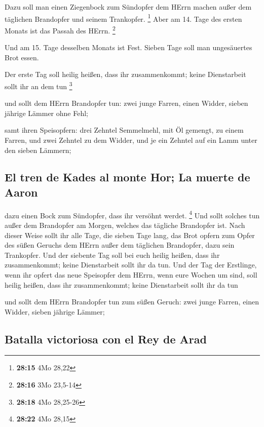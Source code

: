  Dazu soll man einen Ziegenbock zum Sündopfer dem HErrn
machen außer dem täglichen Brandopfer und seinem Trankopfer. \footnote{\textbf{28:15}
  4Mo 28,22}  Aber am 14. Tage des ersten Monats ist das
Passah des HErrn. \footnote{\textbf{28:16} 3Mo 23,5-14}

 Und am 15. Tage desselben Monats ist Fest. Sieben Tage
soll man ungesäuertes Brot essen.

 Der erste Tag soll heilig heißen, dass ihr
zusammenkommt; keine Dienstarbeit sollt ihr an dem tun \footnote{\textbf{28:18}
  4Mo 28,25-26}

 und sollt dem HErrn Brandopfer tun: zwei junge Farren,
einen Widder, sieben jährige Lämmer ohne Fehl;

 samt ihren Speisopfern: drei Zehntel Semmelmehl, mit Öl
gemengt, zu einem Farren, und zwei Zehntel zu dem Widder,
 und je ein Zehntel auf ein Lamm unter den sieben
Lämmern;

\hypertarget{el-tren-de-kades-al-monte-hor-la-muerte-de-aaron}{%
\subsection{El tren de Kades al monte Hor; La muerte de
Aaron}\label{el-tren-de-kades-al-monte-hor-la-muerte-de-aaron}}

 dazu einen Bock zum Sündopfer, dass ihr versöhnt werdet.
\footnote{\textbf{28:22} 4Mo 28,15}  Und sollt solches
tun außer dem Brandopfer am Morgen, welches das tägliche Brandopfer ist.
 Nach dieser Weise sollt ihr alle Tage, die sieben Tage
lang, das Brot opfern zum Opfer des süßen Geruchs dem HErrn außer dem
täglichen Brandopfer, dazu sein Trankopfer.  Und der
siebente Tag soll bei euch heilig heißen, dass ihr zusammenkommt; keine
Dienstarbeit sollt ihr da tun.  Und der Tag der
Erstlinge, wenn ihr opfert das neue Speisopfer dem HErrn, wenn eure
Wochen um sind, soll heilig heißen, dass ihr zusammenkommt; keine
Dienstarbeit sollt ihr da tun

 und sollt dem HErrn Brandopfer tun zum süßen Geruch:
zwei junge Farren, einen Widder, sieben jährige Lämmer;

\hypertarget{batalla-victoriosa-con-el-rey-de-arad}{%
\subsection{Batalla victoriosa con el Rey de
Arad}\label{batalla-victoriosa-con-el-rey-de-arad}}

